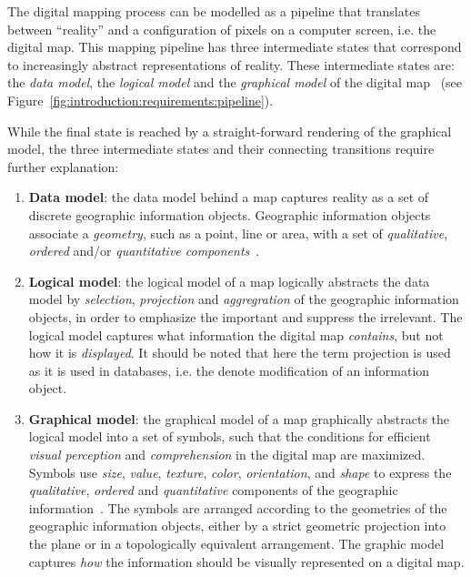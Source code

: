 \documentclass[11pt, oneside]{report}
\begin{document}
{The digital mapping process can be modelled as a pipeline that translates between ``reality'' and a configuration of pixels on a computer screen, i.e. the digital map. This mapping pipeline has three intermediate states that correspond to increasingly abstract representations of reality. These intermediate states are: the \emph{data model}, the \emph{logical model} and the \emph{graphical model} of the digital map~\cite{gruenreich1992atkis} (see Figure~\ref{fig:introduction:requirements:pipeline}).

While the final state is reached by a straight-forward rendering of the graphical model, the three intermediate states and their connecting transitions require further explanation:

\begin{enumerate}
\item \textbf{Data model}: the data model behind a map captures reality as a set of discrete geographic information objects. Geographic information objects associate a \emph{geometry}, such as a point, line or area, with a set of \emph{qualitative}, \emph{ordered} and/or \emph{quantitative components}~\cite{bertin1967semiologie}.
\item \textbf{Logical model}: the logical model of a map logically abstracts the data model by \emph{selection}, \emph{projection} and \emph{aggregration} of the geographic information objects, in order to emphasize the important and suppress the irrelevant. The logical model captures what information the digital map \emph{contains}, but not how it is \emph{displayed}. It should be noted that here the term projection is used as it is used in databases, i.e. the denote modification of an information object.
\item \textbf{Graphical model}: the graphical model of a map graphically abstracts the logical model into a set of symbols, such that the conditions for efficient \emph{visual perception} and \emph{comprehension} in the digital map are maximized. Symbols use \emph{size}, \emph{value}, \emph{texture}, \emph{color}, \emph{orientation}, and \emph{shape} to express the \emph{qualitative}, \emph{ordered} and \emph{quantitative} components of the geographic information~\cite{bertin1967semiologie}. The symbols are arranged according to the geometries of the geographic information objects, either by a strict geometric projection into the plane or in a topologically equivalent arrangement. The graphic model captures \emph{how} the information should be visually represented on a digital map.
\end{enumerate}

}
\end{document}
